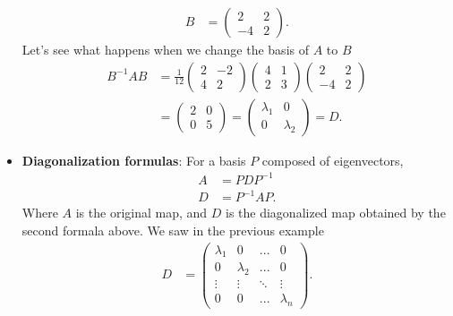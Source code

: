 \documentclass{report}
\begin{document}
\begin{itemize}
            \begin{align*}
                B &= \begin{pmatrix} 2 & 2 \\ -4 & 2\end{pmatrix}
            .\end{align*}
            \bigbreak \noindent 
            Let's see what happens when we change the basis of $A$ to $B$
            \begin{align*}
                B^{-1}AB &= \frac{1}{12}\begin{pmatrix}2 & -2 \\ 4 & 2\end{pmatrix}\begin{pmatrix} 4 & 1 \\ 2 & 3 \end{pmatrix}\begin{pmatrix} 2 & 2 \\ -4 & 2 \end{pmatrix} \\
                         &= \begin{pmatrix} 2 & 0 \\ 0 & 5\end{pmatrix} = \begin{pmatrix} \lambda_{1} & 0 \\ 0 &\lambda_{2} \end{pmatrix} = D
            .\end{align*}
        \item \textbf{Diagonalization formulas}: For a basis $P$ composed of eigenvectors, 
            \begin{align*}
                A &= PDP^{-1} \\
                D &= P^{-1}AP
            .\end{align*}
            Where $A$ is the original map, and $D$ is the diagonalized map obtained by the second formala above. We saw in the previous example
            \begin{align*}
                D &= \begin{pmatrix} \lambda_{1} & 0 & ... & 0 \\ 0 & \lambda_{2} & ... & 0 \\ \vdots & \vdots & \ddots & \vdots \\ 0 & 0 & ... & \lambda_{n} \end{pmatrix}
            .\end{align*}





\end{itemize}
\end{document}
